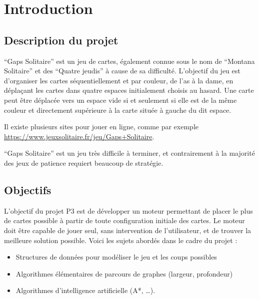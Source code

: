 \chapter{Introduction}

\section{Description du projet}
“Gaps Solitaire” est un jeu de cartes, également connue sous le nom de “Montana Solitaire” et des “Quatre jeudis” à cause de sa difficulté. L'objectif du jeu est d'organiser les cartes séquentiellement et par couleur, de l'as à la dame, en déplaçant les cartes dans quatre espaces initialement choisis au hasard. Une carte peut être déplacée vers un espace vide si et seulement si elle est de la même couleur et directement supérieure à la carte située à gauche du dit espace.

Il existe plusieurs sites pour jouer en ligne, comme par exemple \url{https://www.jeuxsolitaire.fr/jeu/Gaps+Solitaire}.

“Gaps Solitaire” est un jeu très difficile à terminer, et contrairement à la majorité des jeux de patience requiert beaucoup de stratégie.

\section{Objectifs}
L'objectif du projet P3 est de développer un moteur permettant de placer le plus de cartes possible à partir de toute configuration initiale des cartes. Le moteur doit être capable de jouer seul, sans intervention de l'utilisateur, et de trouver la meilleure solution possible. Voici les sujets abordés dans le cadre du projet :

\begin{itemize}
    \item Structures de données pour modéliser le jeu et les coups possibles
    \item Algorithmes élémentaires de parcours de graphes (largeur, profondeur)
    \item Algorithmes d'intelligence artificielle (A*, …).
\end{itemize}

